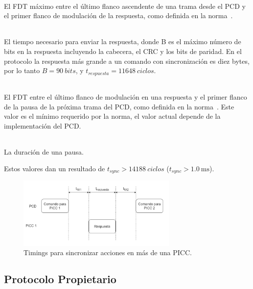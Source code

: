 \documentclass[a4paper, twoside, 11pt]{report}
\begin{document}
\begin{description}[font=\normalfont]
  \item[$t_{fdt1} = 1236$ ciclos:] \hfill \\ El FDT máximo entre el último flanco ascendente de una trama desde el PCD y el primer flanco de modulación de la respuesta, como definida en la norma~\cite{iso14443-3}.
  \item[$t_{respuesta} = 128 \left(B + 1\right)$ ciclos:] \hfill \\ El tiempo necesario para enviar la respuesta, donde B es el máximo número de bits en la respuesta incluyendo la cabecera, el CRC y los bits de paridad. En el protocolo la respuesta más grande a un comando con sincronización es diez bytes, por lo tanto $B = \SI{90}{bits}$, y $t_{respuesta} = \SI{11648}{ciclos}$.
  \item[$t_{fdt2} = 1272$ ciclos:] \hfill \\ El FDT entre el último flanco de modulación en una respuesta y el primer flanco de la pausa de la próxima trama del PCD, como definida en la norma~\cite{iso14443-3}. Este valor es el mínimo requerido por la norma, el valor actual depende de la implementación del PCD.
  \item[$t_p \approx 32$ ciclos:] \hfill \\ La duración de una pausa.
\end{description}

Estos valores dan un resultado de $t_{sync} > \SI{14188}{ciclos}$ ($t_{sync} > \SI{1.0}{\milli\second}$).

\begin{figure}[htb]
  \centering
  \includegraphics[width=0.7\textwidth]{./img/app_synch3.drawio}
  \caption{Timings para sincronizar acciones en más de una PICC.}
  \label{fig:app_synch}
\end{figure}

\FloatBarrier
\subsection{Protocolo Propietario}
\end{document}
